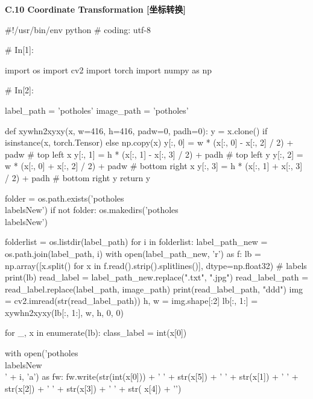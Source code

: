 \documentclass{MathorCupmodeling}
\begin{document}
\textbf{C.10 Coordinate Transformation [坐标转换]}
\begin{python}
#!/usr/bin/env python
# coding: utf-8

# In[1]:


import os
import cv2
import torch
import numpy as np

# In[2]:


label_path = 'potholes'
image_path = 'potholes\images'


def xywhn2xyxy(x, w=416, h=416, padw=0, padh=0):
    y = x.clone() if isinstance(x, torch.Tensor) else np.copy(x)
    y[:, 0] = w * (x[:, 0] - x[:, 2] / 2) + padw  # top left x
    y[:, 1] = h * (x[:, 1] - x[:, 3] / 2) + padh  # top left y
    y[:, 2] = w * (x[:, 0] + x[:, 2] / 2) + padw  # bottom right x
    y[:, 3] = h * (x[:, 1] + x[:, 3] / 2) + padh  # bottom right y
    return y


folder = os.path.exists('potholes\\labelsNew')
if not folder:
    os.makedirs('potholes\\labelsNew')

folderlist = os.listdir(label_path)
for i in folderlist:
    label_path_new = os.path.join(label_path, i)
    with open(label_path_new, 'r') as f:
        lb = np.array([x.split() for x in f.read().strip().splitlines()], dtype=np.float32)  # labels
        print(lb)
    read_label = label_path_new.replace(".txt", ".jpg")
    read_label_path = read_label.replace(label_path, image_path)
    print(read_label_path, "ddd")
    img = cv2.imread(str(read_label_path))
    h, w = img.shape[:2]
    lb[:, 1:] = xywhn2xyxy(lb[:, 1:], w, h, 0, 0)

    for _, x in enumerate(lb):
        class_label = int(x[0])

        with open('potholes\\labelsNew\\' + i, 'a') as fw:
            fw.write(str(int(x[0])) + ' ' + str(x[5]) + ' ' + str(x[1]) + ' ' + str(x[2]) + ' ' + str(x[3]) + ' ' + str(
                x[4]) + '\n')
\end{python}
\end{document}

